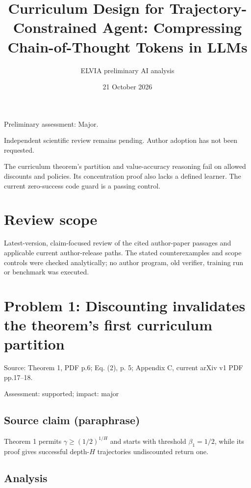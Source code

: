 \documentclass[11pt]{article}
\begin{document}
\title{Curriculum Design for Trajectory-Constrained Agent: Compressing Chain-of-Thought Tokens in LLMs}

\author{ELVIA preliminary AI analysis}\date{21 October 2026}\maketitle

Preliminary assessment: Major.\par

Independent scientific review remains pending. Author adoption has not been requested.

The curriculum theorem’s partition and value-accuracy reasoning fail on allowed discounts and policies. Its concentration proof also lacks a defined learner. The current zero-success code guard is a passing control.

\section*{Review scope}

Latest-version, claim-focused review of the cited author-paper passages and applicable current author-release paths. The stated counterexamples and scope controls were checked analytically; no author program, old verifier, training run or benchmark was executed.

\section*{Problem 1: Discounting invalidates the theorem’s first curriculum partition}

Source: Theorem 1, PDF p.6; Eq. (2), p. 5; Appendix C, current arXiv v1 PDF pp.17–18.

Assessment: supported; impact: major

\subsection*{Source claim (paraphrase)}

Theorem 1 permits \(\gamma\geq(1/2)^{1/H}\) and starts with threshold \(\beta_1=1/2\), while its proof gives successful depth-\(H\) trajectories undiscounted return one.

\subsection*{Analysis}
\end{document}
